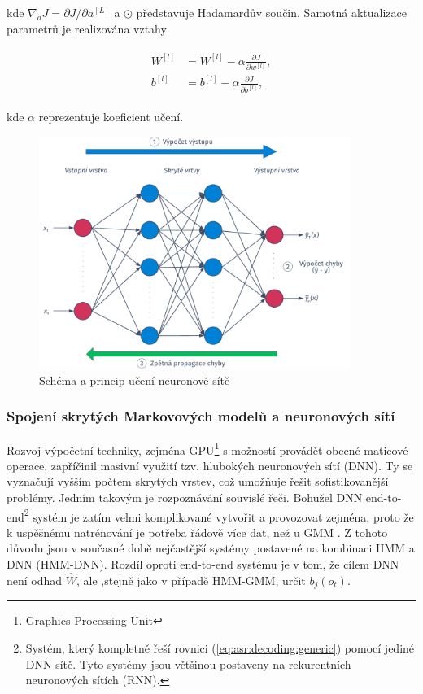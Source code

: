 \noindent kde $\nabla_a J = \partial J / \partial a^{[L]}$ a $\odot$ představuje Hadamardův součin. Samotná aktualizace parametrů je realizována vztahy

\begin{align}
  \begin{split}
    W^{[l]} & = W^{[l]} - \alpha \frac{\partial J}{\partial w^{[l]}}, \\
    b^{[l]} & = b^{[l]} - \alpha \frac{\partial J}{\partial b^{[l]}},
  \end{split}
  \label{eq:asr:acoustic:dnn:update}
\end{align}

\noindent kde $\alpha$ reprezentuje koeficient učení.

\begin{figure}[hbpt]
  \centering
  \includegraphics[width=0.9\textwidth]{./ch4-asr/img/dnn-training.pdf}
  \caption{Schéma a princip učení neuronové sítě}
  \label{fig:asr:acoustic:dnn:training}
\end{figure}

\subsubsection{Spojení skrytých Markovových modelů a neuronových sítí}

Rozvoj výpočetní techniky, zejména GPU\footnote{Graphics Processing Unit} s možností provádět obecné maticové operace, zapříčinil masivní využití tzv. hlubokých neuronových sítí (DNN). Ty se vyznačují vyšším počtem skrytých vrstev, což umožňuje řešit sofistikovanější problémy. Jedním takovým je rozpoznávání souvislé řeči. Bohužel DNN end-to-end\footnote{Systém, který kompletně řeší rovnici (\ref{eq:asr:decoding:generic}) pomocí jediné DNN sítě. Tyto systémy jsou většinou postaveny na rekurentních neuronových sítích (RNN).} systém je zatím velmi komplikované vytvořit a provozovat zejména, proto že k uspěšnému natrénování je potřeba řádově více dat, než u GMM \cite{Amodei2016}. Z tohoto důvodu jsou v současné době nejčastější systémy postavené na kombinaci HMM a DNN (HMM-DNN). Rozdíl oproti end-to-end systému je v tom, že cílem DNN není odhad $\hat{W}$, ale ,stejně jako v případě HMM-GMM, určit $b_j\left(o_t\right)$.


